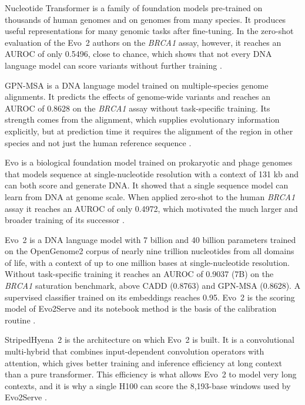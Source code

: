 Nucleotide Transformer is a family of foundation models pre-trained on thousands of human genomes and on genomes from many species. It produces useful representations for many genomic tasks after fine-tuning. In the zero-shot evaluation of the Evo~2 authors on the \textit{BRCA1} assay, however, it reaches an AUROC of only 0.5496, close to chance, which shows that not every DNA language model can score variants without further training \cite{dallatorre2024nt}.

GPN-MSA is a DNA language model trained on multiple-species genome alignments. It predicts the effects of genome-wide variants and reaches an AUROC of 0.8628 on the \textit{BRCA1} assay without task-specific training. Its strength comes from the alignment, which supplies evolutionary information explicitly, but at prediction time it requires the alignment of the region in other species and not just the human reference sequence \cite{benegas2025gpnmsa}.

Evo is a biological foundation model trained on prokaryotic and phage genomes that models sequence at single-nucleotide resolution with a context of 131 kb and can both score and generate DNA. It showed that a single sequence model can learn from DNA at genome scale. When applied zero-shot to the human \textit{BRCA1} assay it reaches an AUROC of only 0.4972, which motivated the much larger and broader training of its successor \cite{nguyen2024evo}.

Evo~2 is a DNA language model with 7 billion and 40 billion parameters trained on the OpenGenome2 corpus of nearly nine trillion nucleotides from all domains of life, with a context of up to one million bases at single-nucleotide resolution. Without task-specific training it reaches an AUROC of 0.9037 (7B) on the \textit{BRCA1} saturation benchmark, above CADD (0.8763) and GPN-MSA (0.8628). A supervised classifier trained on its embeddings reaches 0.95. Evo~2 is the scoring model of Evo2Serve and its notebook method is the basis of the calibration routine \cite{brixi2026evo2}.

StripedHyena~2 is the architecture on which Evo~2 is built. It is a convolutional multi-hybrid that combines input-dependent convolution operators with attention, which gives better training and inference efficiency at long context than a pure transformer. This efficiency is what allows Evo~2 to model very long contexts, and it is why a single H100 can score the 8,193-base windows used by Evo2Serve \cite{brixi2025stripedhyena2}.

